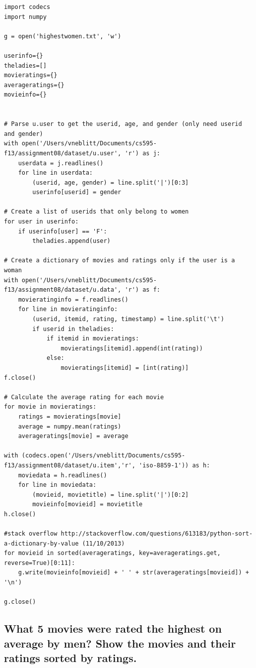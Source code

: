 \documentclass{article}
\begin{document}
\begin{lstlisting}[frame=single, caption=highestwomen.py, label=highwomen]
import codecs
import numpy

g = open('highestwomen.txt', 'w')

userinfo={}
theladies=[]
movieratings={}
averageratings={}
movieinfo={}


# Parse u.user to get the userid, age, and gender (only need userid and gender)
with open('/Users/vneblitt/Documents/cs595-f13/assignment08/dataset/u.user', 'r') as j:
	userdata = j.readlines()
	for line in userdata:
		(userid, age, gender) = line.split('|')[0:3]
		userinfo[userid] = gender

# Create a list of userids that only belong to women
for user in userinfo:
	if userinfo[user] == 'F':
		theladies.append(user)

# Create a dictionary of movies and ratings only if the user is a woman
with open('/Users/vneblitt/Documents/cs595-f13/assignment08/dataset/u.data', 'r') as f:
	movieratinginfo = f.readlines()
	for line in movieratinginfo:
		(userid, itemid, rating, timestamp) = line.split('\t')
		if userid in theladies:
			if itemid in movieratings:
				movieratings[itemid].append(int(rating))
			else:
				movieratings[itemid] = [int(rating)]
f.close()

# Calculate the average rating for each movie
for movie in movieratings:
	ratings = movieratings[movie]
	average = numpy.mean(ratings)
	averageratings[movie] = average

with (codecs.open('/Users/vneblitt/Documents/cs595-f13/assignment08/dataset/u.item','r', 'iso-8859-1')) as h:
	moviedata = h.readlines()
	for line in moviedata:
		(movieid, movietitle) = line.split('|')[0:2]
		movieinfo[movieid] = movietitle
h.close()

#stack overflow http://stackoverflow.com/questions/613183/python-sort-a-dictionary-by-value (11/10/2013)
for movieid in sorted(averageratings, key=averageratings.get, reverse=True)[0:11]:
	g.write(movieinfo[movieid] + ' ' + str(averageratings[movieid]) + '\n')

g.close()
\end{lstlisting}

\newpage
\subsection{What 5 movies were rated the highest on average by men? Show the movies and their ratings sorted by ratings.}
\end{document}
